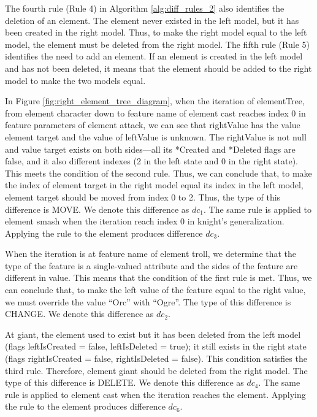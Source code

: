 The fourth rule (Rule 4) in Algorithm \ref{alg:diff_rules_2} also identifies the deletion of an element. The element never existed in the left model, but it has been created in the right model. Thus, to make the right model equal to the left model, the element must be deleted from the right model. The fifth rule (Rule 5) identifies the need to add an element. If an element is created in the left model and has not been deleted, it means that the element should be added to the right model to make the two models equal.

In Figure \ref{fig:right_element_tree_diagram}, when the iteration of \textsf{elementTree}, from element \textsf{character} down to feature \textsf{name} of element \textsf{cast} reaches index 0 in feature \textsf{parameters} of element \textsf{attack}, we can see that \textsf{rightValue} has the value element \textsf{target} and the value of \textsf{leftValue
} is unknown. The \textsf{rightValue} is not null and value \textsf{target} exists on both sides—all its \textsf{*Created} and \textsf{*Deleted} flags are false, and it also different indexes (2 in the left state and 0 in the right state). This meets the condition of the second rule. Thus, we can conclude that, to make the index of element \textsf{target} in the right model equal its index in the left model, element \textsf{target} should be moved from index 0 to 2. Thus, the type of this difference is \textsf{MOVE}. We denote this difference as $dc_{1}$. The same rule is applied to element \textsf{smash} when the iteration reach index 0 in \textsf{knight}’s \textsf{generalization}. Applying the rule to the element produces difference $dc_{3}$.

When the iteration is at feature \textsf{name} of element \textsf{troll}, we determine that the type of the feature is a single-valued attribute and the sides of the feature are different in value. This means that the condition of the first rule is met. Thus, we can conclude that, to make the left value of the feature equal to the right value, we must override the value “Orc” with “Ogre”. The type of this difference is \textsf{CHANGE}. We denote this difference as $dc_{2}$.

At \textsf{giant}, the element used to exist but it has been deleted from the left model (flags \textsf{leftIsCreated} = false, \textsf{leftIsDeleted} = true); it still exists in the right state (flags \textsf{rightIsCreated} = false, \textsf{rightIsDeleted} = false). This condition satisfies the third rule. Therefore, element \textsf{giant} should be deleted from the right model. The type of this difference is \textsf{DELETE}. We denote this difference as $dc_{4}$. The same rule is applied to element \textsf{cast} when the iteration reaches the element. Applying the rule to the element produces difference $dc_{6}$.

